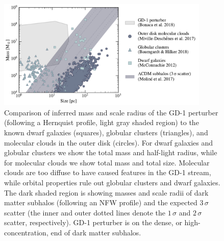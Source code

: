 \documentclass[twocolumn]{aastex62}
\begin{document}
\begin{figure}
\begin{center}
\includegraphics[width=0.9\textwidth]{mass_size.pdf}
\end{center}
\caption{Comparison of inferred mass and scale radius of the GD-1 perturber (following a Hernquist profile, light gray shaded region) to the known dwarf galaxies (squares), globular clusters (triangles), and molecular clouds in the outer disk (circles).
For dwarf galaxies and globular clusters we show the total mass and half-light radius, while for molecular clouds we show total mass and total size.
Molecular clouds are too diffuse to have caused features in the GD-1 stream, while orbital properties rule out globular clusters and dwarf galaxies.
The dark shaded region is showing masses and scale radii of dark matter subhalos (following an NFW profile) and the expected $3\,\sigma$ scatter (the inner and outer dotted lines denote the $1\,\sigma$ and $2\,\sigma$ scatter, respectively).
GD-1 perturber is on the dense, or high-concentration, end of dark matter subhalos.
}
\label{fig:mass_size}
\end{figure}
\end{document}
